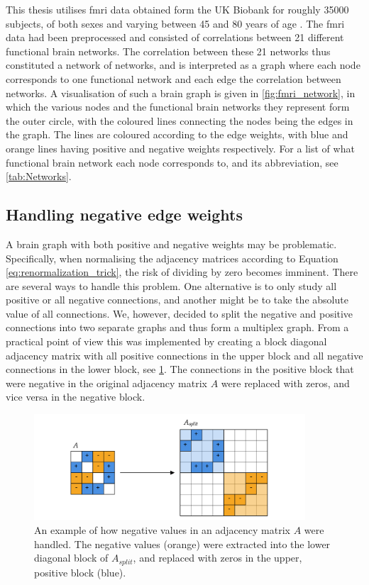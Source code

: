 This thesis utilises \acrshort{fmri} data obtained form the UK Biobank for roughly 35000 subjects, of both sexes and varying between 45 and 80 years of age \cite{ukbiobank}. The \acrshort{fmri} data had been preprocessed and consisted of correlations between 21 different functional brain networks. The correlation between these 21 networks thus constituted a network of networks, and is interpreted as a graph where each node corresponds to one functional network and each edge the correlation between networks. A visualisation of such a brain graph is given in \cref{fig:fmri_network}, in which the various nodes and the functional brain networks they represent form the outer circle, with the coloured lines connecting the nodes being the edges in the graph. The lines are coloured according to the edge weights, with blue and orange lines having positive and negative weights respectively. For a list of what functional brain network each node corresponds to, and its abbreviation, see \cref{tab:Networks}.

\subsection{Handling negative edge weights}
A brain graph with both positive and negative weights may be problematic. Specifically, when normalising the adjacency matrices according to Equation \eqref{eq:renormalization_trick}, the risk of dividing by zero becomes imminent. There are several ways to handle this problem. One alternative is to only study all positive or all negative connections, and another might be to take the absolute value of all connections. We, however, decided to split the negative and positive connections into two separate graphs and thus form a multiplex graph. From a practical point of view this was implemented by creating a block diagonal adjacency matrix with all positive connections in the upper block and all negative connections in the lower block, see \cref{fig:block_diagonal_adjacency_matrix}. The connections in the positive block that were negative in the original adjacency matrix $A$ were replaced with zeros, and vice versa in the negative block.

\begin{figure}[!htbp]
    \centering
    \includegraphics[width=0.9\textwidth]{chapters/images_methods/split.png}
    \caption{An example of how negative values in an adjacency matrix $A$ were handled. The negative values (orange) were extracted into the lower diagonal block of $A_{split}$, and replaced with zeros in the upper, positive block (blue).}
    \label{fig:block_diagonal_adjacency_matrix}
\end{figure}

